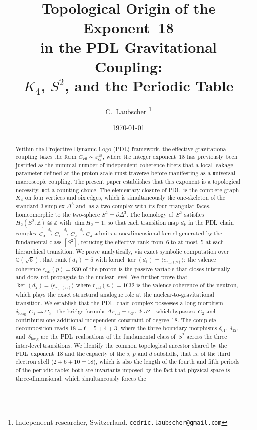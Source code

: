 \documentclass[11pt,a4paper]{article}
\theoremstyle{definition}
\newcommand{\PDL}{\textnormal{PDL}}
\newcommand{\rval}{r_{\mathrm{val}}}
\newcommand{\epsg}{\varepsilon_G}
\newcommand{\Kfour}{K_4}
\newcommand{\Sfour}{\partial\Delta^3}
\newcommand{\Hk}[1]{H_{#1}}
\newcommand{\rank}{\mathrm{rank}}
\newcommand{\dmap}[1]{d_{#1}}
\newcommand{\dlong}{\delta_{\mathrm{long}}}
\newcommand{\calR}{\mathcal{R}}
\newcommand{\calC}{\mathcal{C}}
\begin{document}
\title{%
  Topological Origin of the Exponent~18\\
  in the PDL Gravitational Coupling:\\
  $K_4$, $S^2$, and the Periodic Table%
}
\author{%
  C.~Laubscher%
  \thanks{Independent researcher, Switzerland.
    \texttt{cedric.laubscher@gmail.com}}\\[4pt]%
}
\date{\small \today}
\maketitle
\begin{abstract}
Within the Projective Dynamic Logo (\PDL) framework, the effective gravitational coupling takes the form $G_{\mathrm{eff}} \sim \epsg^{18}$, where the integer exponent~18 has previously been justified as the minimal number of independent coherence filters that a local leakage parameter defined at the proton scale must traverse before manifesting as a universal macroscopic coupling.\cite{Exponent_18_PDL_2026} The present paper establishes that this exponent is a topological necessity, not a counting choice. The elementary closure of \PDL\ is the complete graph $\Kfour$ on four vertices and six edges, which is simultaneously the one-skeleton of the standard $3$-simplex $\Delta^3$ and, as a two-complex with its four triangular faces, homeomorphic to the two-sphere $S^2 = \Sfour$. The homology of~$S^2$ satisfies $\Hk{2}(S^2;\mathbb{Z}) \cong \mathbb{Z}$ with $\dim\Hk{2} = 1$, so that each transition map $\dmap{k}$ in the \PDL\ chain complex $C_0 \xrightarrow{\dmap{0}} C_1 \xrightarrow{\dmap{1}} C_2 \xrightarrow{\dmap{2}} C_3$ admits a one-dimensional kernel generated by the fundamental class $[S^2]$, reducing the effective rank from~6 to at most~5 at each hierarchical transition. We prove analytically, via exact symbolic computation over $\mathbb{Q}(\sqrt{5})$, that $\rank(\dmap{1}) = 5$ with kernel $\ker(\dmap{1}) = \langle e_{\rval(p)}\rangle$: the valence coherence $\rval(p) = 930$ of the proton is the passive variable that closes internally and does not propagate to the nuclear level. We further prove that $\ker(\dmap{2}) = \langle e_{\rval(n)}\rangle$ where $\rval(n) = 1032$ is the valence coherence of the neutron, which plays the exact structural analogue role at the nuclear-to-gravitational transition. We establish that the \PDL\ chain complex possesses a long morphism $\dlong : C_1 \to C_3$---the bridge formula $\Delta\rval = \epsg \cdot \calR \cdot \calC$---which bypasses~$C_2$ and contributes one additional independent constraint of degree~18. The complete decomposition reads $18 = 6 + 5 + 4 + 3$, where the three boundary morphisms $\delta_{01}$, $\delta_{12}$, and~$\dlong$ are the \PDL\ realisations of the fundamental class of~$S^2$ across the three inter-level transitions. We identify the common topological ancestor shared by the \PDL\ exponent~18 and the capacity of the $s$, $p$ and $d$ subshells, that is, of the third electron shell ($2+6+10 = 18$), which is also the length of the fourth and fifth periods of the periodic table: both are invariants imposed by the fact that physical space is three-dimensional, which simultaneously forces the 
\end{abstract}
\end{document}
